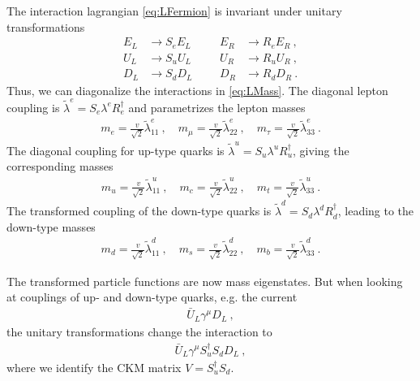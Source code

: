 The interaction lagrangian \eqref{eq:LFermion} is invariant under unitary transformations
\begin{align}
	E_L &\rightarrow S_eE_L && &E_R &\rightarrow R_eE_R \ , \\
	U_L &\rightarrow S_uU_L && &U_R &\rightarrow R_uU_R \ , \\
	D_L &\rightarrow S_dD_L && &D_R &\rightarrow R_dD_R \ .
\end{align}
Thus, we can diagonalize the interactions in \eqref{eq:LMass}. The diagonal lepton coupling is $\tilde{\lambda}^e = S_e\lambda^eR_e^\dagger$ and parametrizes the lepton masses
\begin{align}
	m_e = \frac{v}{\sqrt{2}}\tilde{\lambda}_{11}^e \ , \quad m_\mu = \frac{v}{\sqrt{2}}\tilde{\lambda}_{22}^e \ , \quad m_\tau = \frac{v}{\sqrt{2}}\tilde{\lambda}_{33}^e \ .
\end{align}
The diagonal coupling for up-type quarks is $\tilde{\lambda}^u = S_u\lambda^uR_u^\dagger$, giving the corresponding masses
\begin{align}
	m_u = \frac{v}{\sqrt{2}}\tilde{\lambda}_{11}^u \ , \quad m_c = \frac{v}{\sqrt{2}}\tilde{\lambda}_{22}^u \ , \quad m_t = \frac{v}{\sqrt{2}}\tilde{\lambda}_{33}^u \ .
\end{align}
The transformed coupling of the down-type quarks is $\tilde{\lambda}^d = S_d\lambda^dR_d^\dagger$, leading to the down-type masses
\begin{align}
	m_d = \frac{v}{\sqrt{2}}\tilde{\lambda}_{11}^d \ , \quad m_s = \frac{v}{\sqrt{2}}\tilde{\lambda}_{22}^d \ , \quad m_b = \frac{v}{\sqrt{2}}\tilde{\lambda}_{33}^d \ .
\end{align}


The transformed particle functions are now mass eigenstates. But when looking at couplings of up- and down-type quarks, e.g. the current
\begin{align}
	\bar{U}_L\gamma^\mu D_L \ ,
\end{align}
the unitary transformations change the interaction to
\begin{align}
	\bar{U}_L\gamma^\mu S_u^\dagger S_d D_L \ ,
\end{align}
where we identify the CKM matrix $V = S_u^\dagger S_d$.